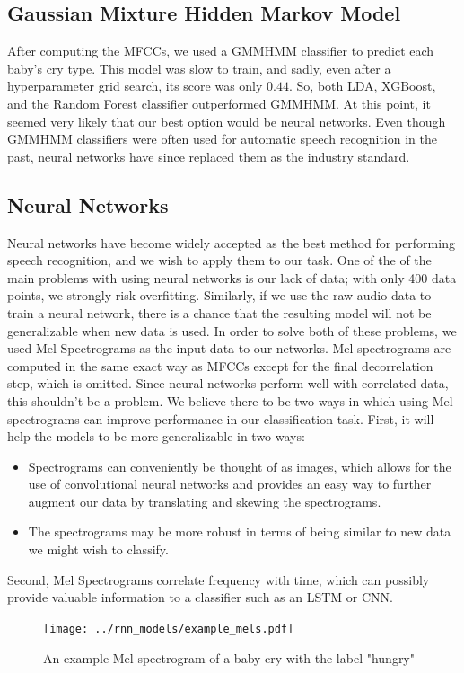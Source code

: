 \documentclass[11pt]{article}
\begin{document}
\subsection{Gaussian Mixture Hidden Markov Model}
After computing the MFCCs, we used a GMMHMM classifier to predict each baby's cry type.
This model was slow to train, and sadly, even after a hyperparameter grid search, its score was only $ 0.44 $.
So, both LDA, XGBoost, and the Random Forest classifier outperformed GMMHMM.
At this point, it seemed very likely that our best option would be neural networks.
Even though GMMHMM classifiers were often used for automatic speech recognition in the past, neural networks have since replaced them as the industry standard.

\subsection{Neural Networks}
Neural networks have become widely accepted as the best method for performing speech recognition, and we wish to apply them to our task. One of the of the main problems with using neural networks is our lack of data; with only 400 data points, we strongly risk overfitting.
Similarly, if we use the raw audio data to train a neural network, there is a chance that the resulting model will not be generalizable when new data is used.
In order to solve both of these problems, we used Mel Spectrograms as the input data to our networks.
Mel spectrograms are computed in the same exact way as MFCCs except for the final decorrelation step, which is omitted.
Since neural networks perform well with correlated data, this shouldn't be a problem.
We believe there to be two ways in which using Mel spectrograms can improve performance in our classification task. First, it will help the models to be more generalizable in two ways:
\begin{itemize}
   \item Spectrograms can conveniently be thought of as images, which allows for the use of convolutional neural networks and provides an easy way to further augment our data by translating and skewing the spectrograms.
   \item The spectrograms may be more robust in terms of being similar to new data we might wish to classify.
\end{itemize}
Second, Mel Spectrograms correlate frequency with time, which can possibly provide valuable information to a classifier such as an LSTM or CNN.
\begin{figure}[!htb]
\begin{center}
   \texttt{[image: ../rnn\_models/example\_mels.pdf]}
   \caption{An example Mel spectrogram of a baby cry with the label "hungry"}
\end{center}
\end{figure}
\end{document}
